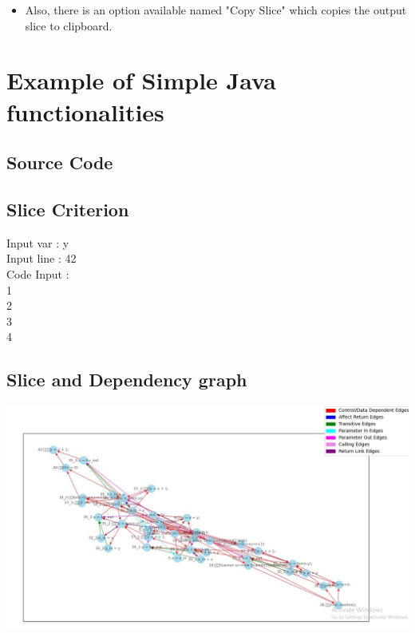 \documentclass[conference]{IEEEtran}
\begin{document}
\begin{itemize}
\begin{itemize}
\begin{flushleft}
    \end{flushleft}
    
\end{itemize}
\end{itemize}
\begin{itemize}
    \item  Also, there is an option available named "Copy Slice" which copies the output slice to clipboard.
\end{itemize}

\section{Example of Simple Java functionalities}
\subsection{Source Code}

\subsection{Slice Criterion}
\begin{flushleft}
Input var : y\\
Input line : 42\\
Code Input  :\\
1\\
2\\
3\\
4\\
\end{flushleft}
\subsection{Slice and Dependency graph}

\includegraphics[scale=0.3]{G1.jpg}
\end{document}
